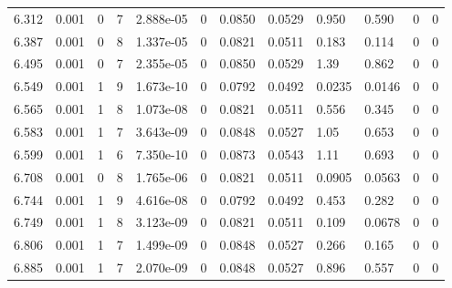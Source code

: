 \documentclass[preview]{standalone}
\begin{document}
{{{{\begin{tabular}{L{1.2cm}C{1.2cm} C{0.3cm}C{0.5cm} C{1.4cm}C{1.4cm} C{1.4cm}C{1.4cm} C{1.6cm}C{1.6cm} C{1.6cm}C{1.6cm}}
  6.312  &  0.001  & 0     &  7 &  2.888e-05  & 0  &  0.0850&   0.0529& 0.950 & 0.590   &  0 & 0  \\ 
  6.387  &  0.001  & 0     &  8 &  1.337e-05  & 0  &  0.0821&   0.0511& 0.183 & 0.114   &  0 & 0  \\ 
  6.495  &  0.001  & 0     &  7 &  2.355e-05  & 0  &  0.0850&   0.0529& 1.39 & 0.862   &  0 & 0  \\ 
  6.549  &  0.001  & 1     &  9 &  1.673e-10  & 0  &  0.0792&   0.0492& 0.0235 & 0.0146   &  0 & 0  \\ 
  6.565  &  0.001  & 1     &  8 &  1.073e-08  & 0  &  0.0821&   0.0511& 0.556 & 0.345   &  0 & 0  \\ 
  6.583  &  0.001  & 1     &  7 &  3.643e-09  & 0  &  0.0848&   0.0527& 1.05 & 0.653   &  0 & 0  \\ 
  6.599  &  0.001  & 1     &  6 &  7.350e-10  & 0  &  0.0873&   0.0543& 1.11 & 0.693   &  0 & 0  \\ 
  6.708  &  0.001  & 0     &  8 &  1.765e-06  & 0  &  0.0821&   0.0511& 0.0905 & 0.0563   &  0 & 0  \\ 
  6.744  &  0.001  & 1     &  9 &  4.616e-08  & 0  &  0.0792&   0.0492& 0.453 & 0.282   &  0 & 0  \\ 
  6.749  &  0.001  & 1     &  8 &  3.123e-09  & 0  &  0.0821&   0.0511& 0.109 & 0.0678   &  0 & 0  \\ 
  6.806  &  0.001  & 1     &  7 &  1.499e-09  & 0  &  0.0848&   0.0527& 0.266 & 0.165   &  0 & 0  \\ 
  6.885  &  0.001  & 1     &  7 &  2.070e-09  & 0  &  0.0848&   0.0527& 0.896 & 0.557   &  0 & 0  \\ 
\hline 
\end{tabular} 

}}}}
\end{document}

